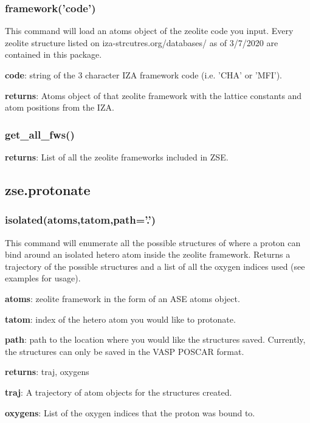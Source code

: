 \documentclass[11pt]{article}
\begin{document}
\subsubsection{framework('code')}
\label{sec:org4a8a171}

This command will load an atoms object of the zeolite code you input. Every zeolite structure listed on iza-strcutres.org/databases/ as of 3/7/2020 are contained in this package.

\textbf{code}: string of the 3 character IZA framework code (i.e. 'CHA' or 'MFI').

\textbf{returns}: Atoms object of that zeolite framework with the lattice constants and atom positions from the IZA. 

\subsubsection{get\_all\_fws()}
\label{sec:orgf741d64}

\textbf{returns}: List of all the zeolite frameworks included in ZSE.
\subsection{zse.protonate}
\label{sec:org57a58e3}

\subsubsection{isolated(atoms,tatom,path='.')}
\label{sec:orgfd7df48}

This command will enumerate all the possible structures of where a proton can bind around an isolated hetero atom inside the zeolite framework. Returns a trajectory of the possible structures and a list of all the oxygen indices used (see examples for usage).

\textbf{atoms}: zeolite framework in the form of an ASE atoms object.

\textbf{tatom}: index of the hetero atom you would like to protonate.

\textbf{path}: path to the location where you would like the structures saved. Currently, the structures can only be saved in the VASP POSCAR format.

\textbf{returns}: traj, oxygens

\textbf{traj}: A trajectory of atom objects for the structures created.

\textbf{oxygens}: List of the oxygen indices that the proton was bound to.
\end{document}
